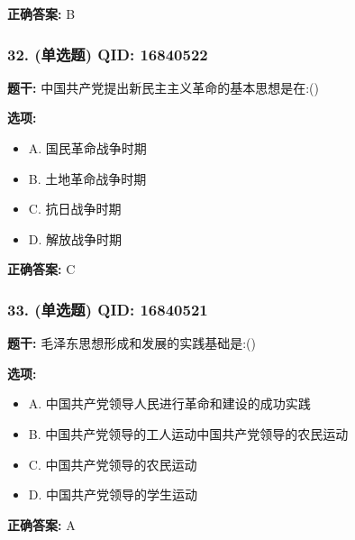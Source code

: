 \documentclass[12pt,UTF8]{ctexart}
\begin{document}
\textbf{正确答案:}
B

\vspace{0.3em}\hrulefill\vspace{0.7em}

\subsubsection*{32. (单选题) \small QID: 16840522}

\textbf{题干:}
中国共产党提出新民主主义革命的基本思想是在:()

\textbf{选项:}
\begin{itemize}[leftmargin=*]

  \item A. 国民革命战争时期

  \item B. 土地革命战争时期

  \item C. 抗日战争时期

  \item D. 解放战争时期

\end{itemize}

\textbf{正确答案:}
C

\vspace{0.3em}\hrulefill\vspace{0.7em}

\subsubsection*{33. (单选题) \small QID: 16840521}

\textbf{题干:}
毛泽东思想形成和发展的实践基础是:()

\textbf{选项:}
\begin{itemize}[leftmargin=*]

  \item A. 中国共产党领导人民进行革命和建设的成功实践

  \item B. 中国共产党领导的工人运动中国共产党领导的农民运动

  \item C. 中国共产党领导的农民运动

  \item D. 中国共产党领导的学生运动

\end{itemize}

\textbf{正确答案:}
A

\vspace{0.3em}\hrulefill\vspace{0.7em}
\end{document}
